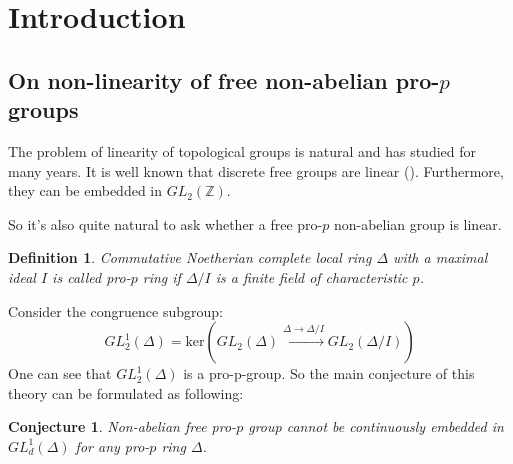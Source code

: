 \documentclass[12pt,a4paper]{article}
\newtheorem*{conjecture*}{Conjecture}
\newtheorem{definition}{Definition}[subsection]
\begin{document}
    \begin{abstract}
        Let $F$ be a free pro-$p$ non-abelian group, and let $\Delta$ be a commutative Noetherian complete local ring with maximal ideal $I$ such that
        $\mathrm{char}(\Delta/I)=p$.\\
        Then consider the group
        \[GL_2^1(\Delta) = \mathrm{ker}\left( GL_2(\Delta) \xrightarrow{\Delta\to\Delta/I} GL_2(\Delta/I) \right)\]
        A.N.\ Zubkov proved that $F$ cannot be continuously embedded in $GL_2^1(\Delta)$ for $p\neq 2$.\\
        D.\ Ben-Ezra and E.\ Zelmanov showed that $F$ cannot be continuously embedded in $GL_2^1(\Delta)$ for $p = 2$ and $\mathrm{char}(\Delta)=2$.\\
        In this paper we are going to prove the same result for $\mathrm{char}(\Delta)=4$.\\
        In the second part we will investigate the connection between PI-theory and the old-standing Gelfand conjecture.
    \end{abstract}


    \section{Introduction}

    \subsection{On non-linearity of free non-abelian pro-$p$ groups}
    The problem of linearity of topological groups is natural and has studied for many years.
    It is well known that discrete free groups are linear (\cite{Sanov}).
    Furthermore, they can be embedded in $GL_2(\mathbb{Z})$.

    So it's also quite natural to ask whether a free pro-$p$ non-abelian group is linear.

    \vskip 0.1in\noindent
    \begin{definition}
        Commutative Noetherian complete local ring $\Delta$ with a maximal ideal $I$ is called pro-$p$ ring if $\Delta/I$ is a finite field of characteristic $p$.
    \end{definition}
    \vskip 0.1in\noindent

    Consider the congruence subgroup:
    \[GL_2^1(\Delta) = \mathrm{ker}\left( GL_2(\Delta) \xrightarrow{\Delta\to\Delta/I} GL_2(\Delta/I) \right)\]
    One can see that $GL_2^1(\Delta)$ is a pro-p-group.
    So the main conjecture of this theory can be formulated as following:
    \vskip 0.1in\noindent
    \begin{conjecture*}
        Non-abelian free pro-$p$ group cannot be continuously embedded in $GL_d^1(\Delta)$ for any pro-$p$ ring $\Delta$.
    \end{conjecture*}
    \vskip 0.1in\noindent
\end{document}
